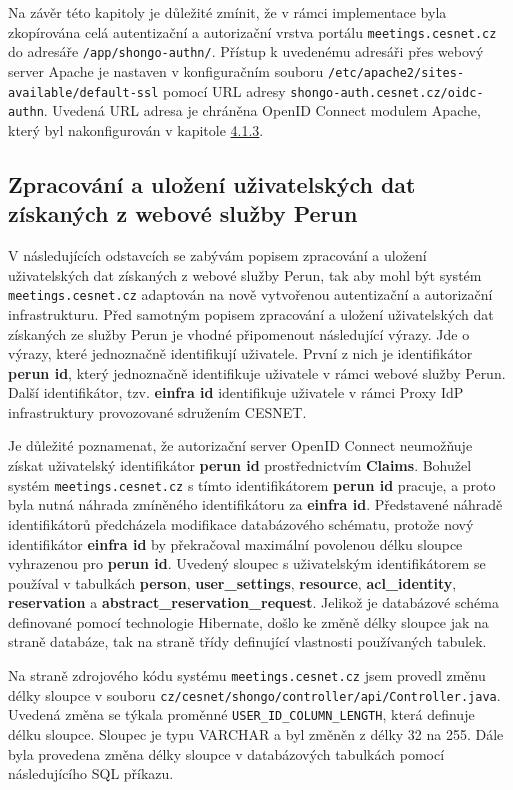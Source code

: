 \documentclass[
  printed, %
  twoside, %
  table,   %
  nolof,     %
  nolot,     %
]{fithesis3}
\begin{document}
Na závěr této kapitoly je důležité zmínit, že v rámci implementace byla zkopírována celá autentizační a autorizační vrstva portálu \texttt{meetings.cesnet.cz} do adresáře \texttt{/app/shongo-authn/}. Přístup k uvedenému adresáři přes webový server Apache je nastaven v konfiguračním souboru \texttt{/etc/apache2/sites-available/default-ssl} pomocí URL adresy \texttt{shongo-auth.cesnet.cz/oidc-authn}. Uvedená URL adresa je chráněna OpenID Connect modulem Apache, který byl nakonfigurován v kapitole \hyperref[sec:mod-conf]{4.1.3}.

\subsection{Zpracování a uložení uživatelských dat získaných z webové služby Perun}
\label{zpracovaniAUlozeniPerun}
V následujících odstavcích se zabývám popisem zpracování a uložení uživatelských dat získaných z webové služby Perun, tak aby mohl být systém \texttt{meetings.cesnet.cz} adaptován na nově vytvořenou autentizační a autorizační infrastrukturu. Před samotným popisem zpracování a uložení uživatelských dat získaných ze služby Perun je vhodné připomenout následující výrazy. Jde o výrazy, které  jednoznačně identifikují uživatele. První z nich je identifikátor \textbf{perun id}, který jednoznačně identifikuje uživatele v rámci webové služby Perun. Další identifikátor, tzv. \textbf{einfra id} identifikuje uživatele v rámci Proxy IdP infrastruktury provozované sdružením CESNET.  
\par

Je důležité poznamenat, že autorizační server OpenID Connect neumožňuje získat uživatelský identifikátor \textbf{perun id} prostřednictvím \textbf{Claims}. Bohužel systém \texttt{meetings.cesnet.cz} s tímto identifikátorem \textbf{perun id} pracuje, a proto byla nutná náhrada zmíněného identifikátoru za \textbf{einfra id}. Představené náhradě identifikátorů předcházela modifikace databázového schématu, protože nový identifikátor \textbf{einfra id} by překračoval maximální povolenou délku sloupce vyhrazenou pro \textbf{perun id}. Uvedený sloupec s uživatelským identifikátorem se používal v tabulkách \textbf{person}, \textbf{user\_settings}, \textbf{resource}, \textbf{acl\_identity}, \textbf{reservation} a \textbf{abstract\_reservation\_request}. Jelikož je databázové schéma definované pomocí technologie Hibernate, došlo ke změně délky sloupce jak na straně databáze, tak na straně třídy definující vlastnosti používaných tabulek. 
\par  
Na straně zdrojového kódu systému \texttt{meetings.cesnet.cz} jsem provedl změnu délky sloupce v souboru \texttt{cz/cesnet/shongo/controller/api/Controller.java}. Uvedená změna se týkala proměnné \texttt{USER\_ID\_COLUMN\_LENGTH}, která definuje délku sloupce. Sloupec je typu VARCHAR a byl změněn z délky 32 na 255. Dále byla provedena změna délky sloupce v databázových tabulkách pomocí následujícího SQL příkazu.
\end{document}
